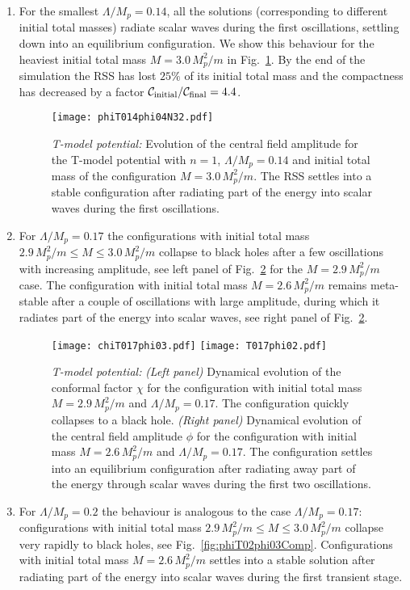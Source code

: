 \documentclass[11pt,a4paper]{article}
\begin{document}
\begin{enumerate}
\item For the smallest $\Lambda/M_p = 0.14$, all the solutions (corresponding to different initial total masses) radiate scalar waves during the first oscillations, settling down into an equilibrium configuration. We show this behaviour for the heaviest initial total mass $M = 3.0 \, M_p^2/m$ in Fig.~\ref{fig:phiT014phi04N32}. By the end of the simulation the RSS has lost $25\%$ of its initial total mass and the compactness has decreased by a factor $\mathcal{C}_{\rm initial}/\mathcal{C}_{\rm final} = 4.4$.

\begin{figure}[h!]
    \centering
    \texttt{[image: phiT014phi04N32.pdf]}
    \caption{{\it T-model potential: }Evolution of the central field amplitude for the T-model potential with $n = 1$, $\Lambda/M_p = 0.14$ and initial total mass of the configuration $M = 3.0 \, M_p^2/m$. The RSS settles into a stable configuration after radiating part of the energy into scalar waves during the first oscillations.}
\label{fig:phiT014phi04N32}
\end{figure}

\item For $\Lambda/M_p = 0.17$ the configurations with initial total mass $2.9 \, M_p^2/m \leq M \leq 3.0 \, M_p^2/m$ collapse to black holes after a few oscillations with increasing amplitude, see left panel of Fig.~\ref{fig:T017phi0203} for the $M = 2.9 \, M_p^2/m$ case. The configuration with initial total mass $M = 2.6 \, M_p^2/m$ remains meta-stable after a couple of oscillations with large amplitude, during which it radiates part of the energy into scalar waves, see right panel of Fig.~\ref{fig:T017phi0203}.
\begin{figure}[h!]
    \centering
    \texttt{[image: chiT017phi03.pdf]}
    \texttt{[image: T017phi02.pdf]}
    \caption{{\it T-model potential: }\textit{(Left panel)} Dynamical evolution of the conformal factor $\chi$ for the configuration with initial total mass $M = 2.9 \, M_p^2/m$ and $\Lambda/M_p = 0.17$. The configuration quickly collapses to a black hole. \textit{(Right panel)} Dynamical evolution of the central field amplitude $\phi$ for the configuration with initial mass $M = 2.6 \, M_p^2/m$ and $\Lambda/M_p = 0.17$. The configuration settles into an equilibrium configuration after radiating away part of the energy through scalar waves during the first two oscillations.}
\label{fig:T017phi0203}
\end{figure}
\item For $\Lambda/M_p = 0.2$ the behaviour is analogous to the case $\Lambda/M_p = 0.17$: configurations with initial total mass $2.9 \, M_p^2/m \leq M \leq 3.0 \, M_p^2/m$ collapse very rapidly to black holes, see Fig.~\ref{fig:phiT02phi03Comp}. Configurations with initial total mass $M = 2.6 \, M_p^2/m$ settles into a stable solution after radiating part of the energy into scalar waves during the first transient stage.
\end{enumerate}
\end{document}
